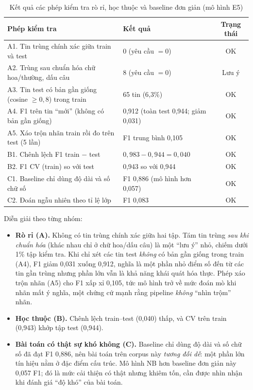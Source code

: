 \begin{table}[H]
\centering
\caption{Kết quả các phép kiểm tra rò rỉ, học thuộc và baseline đơn giản (mô hình E5)}
\label{tab:sanity}
\small
\begin{tabular}{|p{6.1cm}|p{4.6cm}|c|}
\hline
\textbf{Phép kiểm tra} & \textbf{Kết quả} & \textbf{Trạng thái} \\
\hline
A1. Tin trùng chính xác giữa train và test & 0 (yêu cầu $=0$) & OK \\
\hline
A2. Trùng sau chuẩn hóa chữ hoa/thường, dấu câu & 8 (yêu cầu $=0$) & Lưu ý \\
\hline
A3. Tin test có bản gần giống (cosine $\ge0{,}8$) trong train & 65 tin (6,3\%) & OK \\
\hline
A4. F1 trên tin ``mới'' (không có bản gần giống) & 0,912 (toàn test 0,944; giảm 0,031) & OK \\
\hline
A5. Xáo trộn nhãn train rồi đo trên test (5 lần) & F1 trung bình 0,105 & OK \\
\hline
B1. Chênh lệch F1 train $-$ test & $0{,}983-0{,}944=0{,}040$ & OK \\
\hline
B2. F1 CV (train) so với test & 0,943 so với 0,944 & OK \\
\hline
C1. Baseline chỉ dùng độ dài và số chữ số & F1 0,886 (mô hình hơn 0,057) & OK \\
\hline
C2. Đoán ngẫu nhiên theo tỉ lệ lớp & F1 0,083 & OK \\
\hline
\end{tabular}
\end{table}

Diễn giải theo từng nhóm:

\begin{itemize}
    \item \textbf{Rò rỉ (A).} Không có tin trùng chính xác giữa hai tập. Tám tin trùng \textit{sau khi chuẩn hóa} (khác nhau chỉ ở chữ hoa/dấu câu) là một ``lưu ý'' nhỏ, chiếm dưới 1\% tập kiểm tra. Khi chỉ xét các tin test \textit{không} có bản gần giống trong train (A4), F1 giảm 0,031 xuống 0,912, nghĩa là một phần nhỏ điểm số đến từ các tin gần trùng nhưng phần lớn vẫn là khả năng khái quát hóa thực. Phép xáo trộn nhãn (A5) cho F1 xấp xỉ 0,105, tức mô hình trở về mức đoán mò khi nhãn mất ý nghĩa, một chứng cứ mạnh rằng pipeline \textit{không} ``nhìn trộm'' nhãn.
    \item \textbf{Học thuộc (B).} Chênh lệch train--test (0,040) thấp, và CV trên train (0,943) khớp tập test (0,944).
    \item \textbf{Bài toán có thật sự khó không (C).} Baseline chỉ dùng độ dài và số chữ số đã đạt F1 0,886, nên bài toán trên corpus này \textit{tương đối dễ}: một phần lớn tín hiệu nằm ở đặc điểm cấu trúc. Mô hình NB hơn baseline đơn giản này 0,057 F1; đó là mức cải thiện có thật nhưng khiêm tốn, cần được nhìn nhận khi đánh giá ``độ khó'' của bài toán.
\end{itemize}

